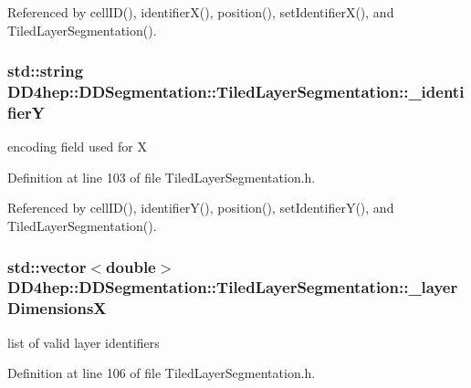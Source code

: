 Referenced by cellID(), identifierX(), position(), setIdentifierX(), and TiledLayerSegmentation().\hypertarget{class_d_d4hep_1_1_d_d_segmentation_1_1_tiled_layer_segmentation_af157c59a13254572f336a345463e993d}{
\subsubsection[{\_\-identifierY}]{\setlength{\rightskip}{0pt plus 5cm}std::string {\bf DD4hep::DDSegmentation::TiledLayerSegmentation::\_\-identifierY}}}
\label{class_d_d4hep_1_1_d_d_segmentation_1_1_tiled_layer_segmentation_af157c59a13254572f336a345463e993d}


encoding field used for X 

Definition at line 103 of file TiledLayerSegmentation.h.

Referenced by cellID(), identifierY(), position(), setIdentifierY(), and TiledLayerSegmentation().\hypertarget{class_d_d4hep_1_1_d_d_segmentation_1_1_tiled_layer_segmentation_afd897bc752982287d6184099d6badede}{
\subsubsection[{\_\-layerDimensionsX}]{\setlength{\rightskip}{0pt plus 5cm}std::vector$<$double$>$ {\bf DD4hep::DDSegmentation::TiledLayerSegmentation::\_\-layerDimensionsX}}}
\label{class_d_d4hep_1_1_d_d_segmentation_1_1_tiled_layer_segmentation_afd897bc752982287d6184099d6badede}


list of valid layer identifiers 

Definition at line 106 of file TiledLayerSegmentation.h.

